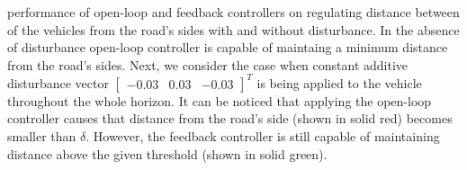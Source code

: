 performance of open-loop and feedback controllers on regulating distance between of the vehicles from the road's sides with and without disturbance. In the absence of disturbance open-loop controller is capable of maintaing a minimum distance from the road's sides. Next, we consider the case when constant additive disturbance vector $\begin{bmatrix}-0.03 &0.03&-0.03\end{bmatrix}^T$ is being applied to the vehicle throughout the whole horizon. It can be noticed that applying the open-loop controller causes that distance from the road's side (shown in solid red) becomes smaller than $\delta$. However, the feedback controller is still capable of maintaining distance above the given threshold (shown in solid green).





%



